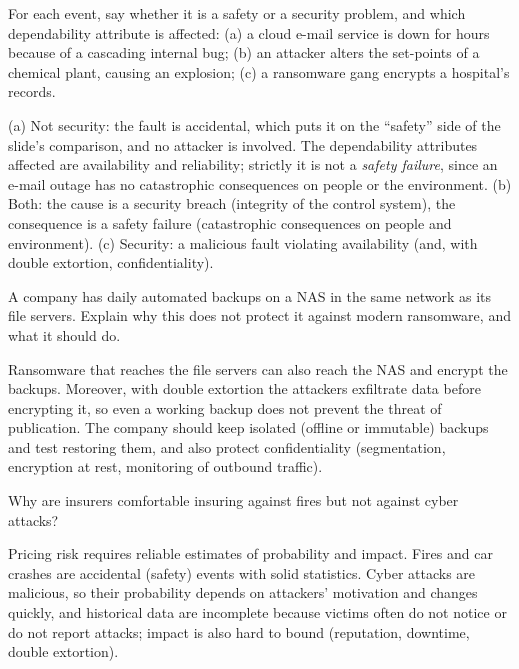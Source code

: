 \begin{exercise}
For each event, say whether it is a safety or a security problem, and which dependability attribute is affected: (a) a cloud e-mail service is down for hours because of a cascading internal bug; (b) an attacker alters the set-points of a chemical plant, causing an explosion; (c) a ransomware gang encrypts a hospital's records.
\end{exercise}
\begin{solution}
(a) Not security: the fault is accidental, which puts it on the \enquote{safety} side of the slide's comparison, and no attacker is involved. The dependability attributes affected are availability and reliability; strictly it is not a \emph{safety failure}, since an e-mail outage has no catastrophic consequences on people or the environment. (b) Both: the cause is a security breach (integrity of the control system), the consequence is a safety failure (catastrophic consequences on people and environment). (c) Security: a malicious fault violating availability (and, with double extortion, confidentiality).
\end{solution}

\begin{exercise}
A company has daily automated backups on a NAS in the same network as its file servers. Explain why this does not protect it against modern ransomware, and what it should do.
\end{exercise}
\begin{solution}
Ransomware that reaches the file servers can also reach the NAS and encrypt the backups. Moreover, with double extortion the attackers exfiltrate data before encrypting it, so even a working backup does not prevent the threat of publication. The company should keep isolated (offline or immutable) backups and test restoring them, and also protect confidentiality (segmentation, encryption at rest, monitoring of outbound traffic).
\end{solution}

\begin{exercise}
Why are insurers comfortable insuring against fires but not against cyber attacks?
\end{exercise}
\begin{solution}
Pricing risk requires reliable estimates of probability and impact. Fires and car crashes are accidental (safety) events with solid statistics. Cyber attacks are malicious, so their probability depends on attackers' motivation and changes quickly, and historical data are incomplete because victims often do not notice or do not report attacks; impact is also hard to bound (reputation, downtime, double extortion).
\end{solution}
